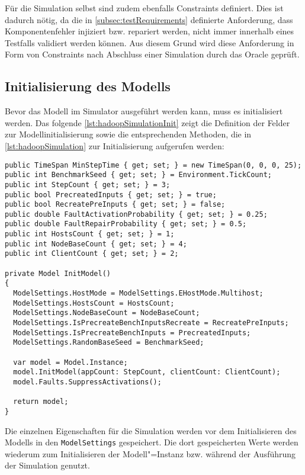 Für die Simulation selbst sind zudem ebenfalls Constraints definiert.
Dies ist dadurch nötig, da die in \cref{subsec:testRequirements} definierte Anforderung, dass Komponentenfehler injiziert bzw. repariert werden, nicht immer innerhalb eines Testfalls validiert werden können.
Aus diesem Grund wird diese Anforderung in Form von Constraints nach Abschluss einer Simulation durch das Oracle geprüft.

\subsection{Initialisierung des Modells}
\label{subsec:simulationModelInit}

Bevor das Modell im Simulator ausgeführt werden kann, muss es initialisiert werden.
Das folgende \cref{lst:hadoopSimulationInit} zeigt die Definition der Felder zur Modellinitialisierung sowie die entsprechenden Methoden, die in \cref{lst:hadoopSimulation} zur Initialisierung aufgerufen werden:

\begin{lstlisting}[label=lst:hadoopSimulationInit,style=cs,
caption={Initialisierung des Modells für die Simulation}]
public TimeSpan MinStepTime { get; set; } = new TimeSpan(0, 0, 0, 25);
public int BenchmarkSeed { get; set; } = Environment.TickCount;
public int StepCount { get; set; } = 3;
public bool PrecreatedInputs { get; set; } = true;
public bool RecreatePreInputs { get; set; } = false;
public double FaultActivationProbability { get; set; } = 0.25;
public double FaultRepairProbability { get; set; } = 0.5;
public int HostsCount { get; set; } = 1;
public int NodeBaseCount { get; set; } = 4;
public int ClientCount { get; set; } = 2;

private Model InitModel()
{
  ModelSettings.HostMode = ModelSettings.EHostMode.Multihost;
  ModelSettings.HostsCount = HostsCount;
  ModelSettings.NodeBaseCount = NodeBaseCount;
  ModelSettings.IsPrecreateBenchInputsRecreate = RecreatePreInputs;
  ModelSettings.IsPrecreateBenchInputs = PrecreatedInputs;
  ModelSettings.RandomBaseSeed = BenchmarkSeed;
  
  var model = Model.Instance;
  model.InitModel(appCount: StepCount, clientCount: ClientCount);
  model.Faults.SuppressActivations();
  
  return model;
}
\end{lstlisting}

Die einzelnen Eigenschaften für die Simulation werden vor dem Initialisieren des Modells in den \texttt{ModelSettings} gespeichert.
Die dort gespeicherten Werte werden wiederum zum Initialisieren der Modell"=Instanz bzw. während der Ausführung der Simulation genutzt.

